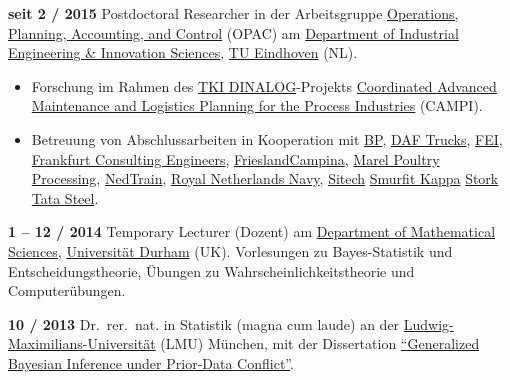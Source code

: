 \documentclass[a4paper]{simplecv}
\begin{document}
\begin{topic}
\item[\hspace*{-2ex}\bfseries seit 2 / 2015] Postdoctoral Researcher
                  in der Arbeitsgruppe \href{http://opac.ieis.tue.nl/}{\glqq Operations, Planning, Accounting, and Control\grqq} (OPAC)
                  am \href{http://www.tue.nl/en/}{Department of Industrial Engineering \& Innovation Sciences},
                  \href{http://www.tue.nl/en/}{TU Eindhoven} (NL).
\begin{itemize}
\item Forschung im Rahmen des \href{http://www.dinalog.nl/en/}{TKI DINALOG}-Projekts
\href{http://www.dinalog.nl/en/project/campi/}{\glqq Coordinated Advanced Maintenance and Logistics Planning for the Process Industries\grqq} (CAMPI).
\item Betreuung von Abschlussarbeiten in Kooperation mit
\href{http://www.bp.com/nl_nl/netherlands/over-bp/onze-raffinaderij.html}{BP},
\href{http://www.daf.com/EN}{DAF Trucks},
\href{http://www.fei.com/locations/fei-netherlands/}{FEI},
\href{http://frankfurt-consulting.de}{Frankfurt Consulting Engineers},
\href{http://www.frieslandcampina.com/en/}{FrieslandCampina},
\href{http://marel.com/poultry-processing}{Marel Poultry Processing},
\href{http://www.nedtrain.nl/}{NedTrain},
\href{http://www.defensie.nl/english/organisation/navy}{Royal Netherlands Navy},
\href{http://www.sitech.nl/en}{Sitech}
\href{http://www.smurfitkappa.com/vHome/nl/Roermond}{Smurfit Kappa}
\href{http://www.stork.com/en}{Stork}
\href{http://www.tatasteel.nl}{Tata Steel}.
\end{itemize}

\item[\hspace*{-2ex}\bfseries 1 -- 12 / 2014] Temporary Lecturer (Dozent)
                  am \href{http://www.dur.ac.uk/mathematical.sciences/}{Department of Mathematical Sciences},
                  \href{http://www.durham.ac.uk}{Universität Durham} (UK).
                  Vorlesungen zu Bayes-Statistik und Entscheidungstheorie,
                  Übungen zu Wahrscheinlichkeitstheorie und Computerübungen. 

\item[\hspace*{-2ex}\bfseries 10 / 2013] Dr.\ rer.\ nat. in Statistik (magna cum laude) an der
                  \href{http://www.lmu.de}{Lud\-wig-Maximi\-li\-ans-Uni\-ver\-si\-tät} (LMU) München,
                  mit der Dissertation \href{https://edoc.ub.uni-muenchen.de/17059/}{``Generalized Bayesian Inference under Prior-Data Conflict''}.



\end{topic}
\end{document}
